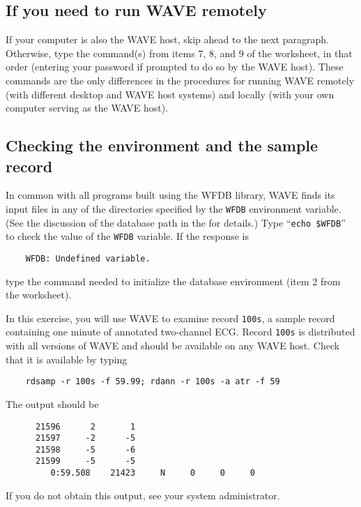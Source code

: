 \documentclass[twoside]{book}
\newcommand{\WAVE}{{\sf WAVE}\xspace}
\begin{document}
\subsection*{If you need to run \WAVE{} remotely}

If your computer is also the \WAVE{} host,
\index{WAVE host@\WAVE{} host}
skip ahead to the next
paragraph.  Otherwise, type the command(s) from items 7, 8, and 9 of
the worksheet, in that order (entering your password if prompted
to do so by the \WAVE{} host).  These commands are the only
differences in the procedures for running \WAVE{} remotely (with
different desktop and \WAVE{} host systems) and locally (with your
own computer serving as the \WAVE{} host).

\subsection*{Checking the environment and the sample record}

\label{sec:wfdb-path}
In common with all programs built using the WFDB library, \WAVE{} finds its
input files in any of the directories specified by the {\tt WFDB} environment
variable.
(See the discussion of the database path in the
for details.) Type ``{\tt echo \$WFDB}''
to check the value of the {\tt WFDB} variable.  If the response is
\begin{verbatim}
    WFDB: Undefined variable.
\end{verbatim}
type the command needed to initialize the database environment (item 2 from
the worksheet).

In this exercise, you will use \WAVE{} to examine record {\tt 100s}, a
sample record containing one minute of annotated two-channel ECG.  Record
{\tt 100s} is distributed with all versions of \WAVE{} and should be
available on any \WAVE{} host.  Check that it is available by typing
\begin{verbatim}
    rdsamp -r 100s -f 59.99; rdann -r 100s -a atr -f 59
\end{verbatim}
The output should be
\begin{verbatim}
      21596      2       1
      21597     -2      -5
      21598     -5      -6
      21599     -5      -5
         0:59.508    21423     N     0     0     0
\end{verbatim}
If you do not obtain this output, see your system administrator.
\end{document}
